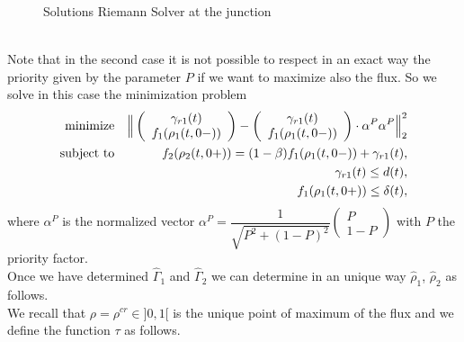 \documentclass[12pt,subeqn]{article}
\numberwithin{equation}{section}
\begin{document}
\begin{figure}[h]
\centering
{}
\caption{Solutions Riemann Solver at the junction}
\label{fig:junctionRS}
\end{figure}\\
Note that in the second case it is not possible to respect in an exact way the priority given by the parameter $P$ if we want to maximize also the flux. So we solve in this case the minimization problem
\begin{equation}
	\begin{aligned}
		{\text{minimize}}
		& &  \Big\|  \left( \begin{array}{c}
							\gamma_{r1}(t) \\
							f_{1}(\rho_1(t,0-)) 
							\end{array} \right)- \left( \begin{array}{c}
															\gamma_{r1}(t) \\
															f_{1}(\rho_1(t,0-)) 
															\end{array} \right) \cdot \alpha^P \alpha^P \Big\|^2_2 \\
		\vspace{1pt}															
		\text{subject to}
		& & f_{2}(\rho_2(t,0+)) = (1-\beta)f_{1}(\rho_1(t,0-)) + \gamma_{r1}(t),\\
		& & \gamma_{r1}(t) \leq d(t),\\
		& & f_{1}(\rho_1(t,0+)) \leq \delta(t),
	\end{aligned}
	\label{eq:minimizationP}
\end{equation}
where $\alpha^P$ is the normalized vector $\alpha^P=\dfrac{1}{\sqrt{P^2+(1-P)^2}}\left( \begin{array}{c}
							P \\
							1-P 
							\end{array} \right)$ with $P$ the priority factor.\\
Once we have determined $\hat{\Gamma}_1$ and $\hat{\Gamma}_2$ we can determine in an unique way $\hat{\rho}_1$, $\hat{\rho}_2$ as follows. \\
We recall that $\rho=\rho^{cr}\in]0,1[$ is the unique point of maximum of the flux and we define the function $\tau$ as follows.
\end{document}
